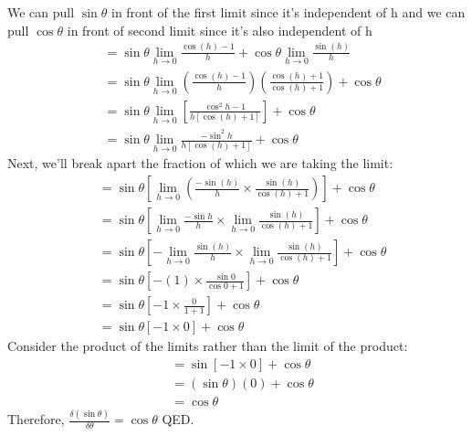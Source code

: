 \documentclass{article}
\begin{document}
\newpage 
We can pull $\sin \theta$  in front of the first limit since it’s independent of h and we can pull $\cos \theta$ in front of second limit since it’s also independent of h
$$
\begin{aligned}
& =\sin \theta \lim _{h \rightarrow 0} \frac{\cos (h)-1}{h}+\cos \theta \lim _{h \rightarrow 0} \frac{\sin (h)}{h} \\
& =\sin \theta \lim _{h \rightarrow 0}\left(\frac{\cos (h)-1}{h}\right)\left(\frac{\cos (h)+1}{\cos (h)+1}\right)+\cos \theta \\
& =\sin \theta \lim _{h \rightarrow 0}\left[\frac{\cos ^2 h-1}{h[\cos (h)+1]}\right]+\cos \theta \\
& =\sin \theta \lim _{h \rightarrow 0} \frac{-\sin ^2 h}{h[\cos (h)+1]}+\cos \theta
\end{aligned}
$$
Next, we’ll break apart the fraction of which we are taking the limit:
$$
\begin{aligned}
& =\sin \theta\left[\lim _{h \rightarrow 0}\left(\frac{-\sin (h)}{h} \times \frac{\sin (h)}{\cos (h)+1}\right)\right]+\cos \theta \\
& =\sin \theta\left[\lim _{h \rightarrow 0} \frac{-\sin h}{h} \times \lim _{h \rightarrow 0} \frac{\sin (h)}{\cos (h)+1}\right]+\cos \theta \\
& =\sin \theta\left[-\lim _{h \rightarrow 0} \frac{\sin (h)}{h} \times \lim _{h \rightarrow 0} \frac{\sin (h)}{\cos (h)+1}\right]+\cos \theta \\
& =\sin \theta\left[-(1) \times \frac{\sin 0}{\cos 0+1}\right]+\cos \theta \\
& =\sin \theta\left[-1 \times \frac{0}{1+1}\right]+\cos \theta \\
& =\sin \theta[-1 \times 0]+\cos \theta
\end{aligned}
$$
Consider the product of the limits rather than the limit of the product:
\begin{align*}
    &=\sin[-1\times 0]+\cos\theta\\
    &=(\sin\theta)(0)+\cos \theta\\
    &=\cos \theta
\end{align*}
Therefore, $\frac{\delta (\sin \theta)}{\delta \theta}=\cos \theta$ QED.
\end{document}
